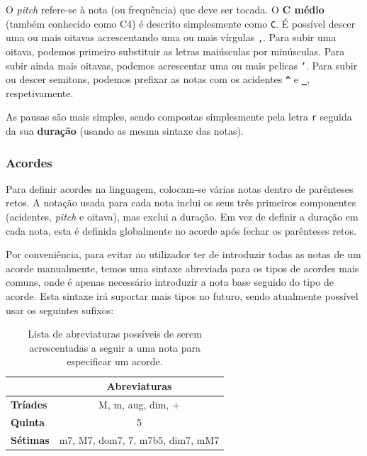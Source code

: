 O \textit{pitch} refere-se à nota (ou frequência) que deve ser tocada. O \textbf{C médio} (também conhecido como C4) é descrito simplesmente como \texttt{C}. É possível descer uma ou mais oitavas acrescentando uma ou mais vírgulas \texttt{,}. Para subir uma oitava, podemos primeiro substituir as letras maiúsculas por minúsculas. Para subir ainda mais oitavas, podemos acrescentar uma ou mais pelicas \texttt{'}. Para subir ou descer semitons, podemos prefixar as notas com os acidentes \textbf{\texttt{\textasciicircum{}}} e \textbf{\texttt{\_}}, respetivamente.

As pausas são mais simples, sendo compostas simplesmente pela letra \texttt{r} seguida da sua \textbf{duração} (usando as mesma sintaxe das notas).

\subsubsection{\textbf{Acordes}}
Para definir acordes na linguagem, colocam-se várias notas dentro de parênteses retos. A notação usada para cada nota inclui os seus três primeiros componentes (acidentes, \textit{pitch} e oitava), mas exclui a duração. Em vez de definir a duração em cada nota, esta é definida globalmente no acorde após fechar os parênteses retos.

Por conveniência, para evitar ao utilizador ter de introduzir todas as notas de um acorde manualmente, temos uma sintaxe abreviada para os tipos de acordes mais comuns, onde é apenas necessário introduzir a nota base seguido do tipo de acorde. Esta sintaxe irá suportar mais tipos no futuro, sendo atualmente possível usar os seguintes sufixos:

\begin{table}[h]
\centering
\def\arraystretch{1.3}
\begin{tabular}{|l|c|}
\hline
\textbf{}        & \textbf{Abreviaturas}           \\ \hline
\textbf{Tríades} & M, m, aug, dim, +                \\ \hline
\textbf{Quinta}  & 5                                \\ \hline
\textbf{Sétimas} & m7, M7, dom7, 7, m7b5, dim7, mM7 \\ \hline
\end{tabular}
\caption{Lista de abreviaturas possíveis de serem acrescentadas a seguir a uma nota para especificar um acorde.}
\label{tab:chord-suffixes}
\end{table}

